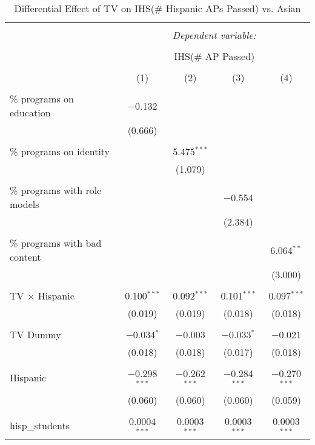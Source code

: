 
\begin{table}[!htbp] \centering 
  \caption{Differential Effect of TV on IHS(\# Hispanic APs Passed) vs. Asian} 
  \label{} 
\begin{tabular}{@{\extracolsep{-2pt}}lcccc} 
\\[-1.8ex]\hline 
\hline \\[-1.8ex] 
 & \multicolumn{4}{c}{\textit{Dependent variable:}} \\ 
\cline{2-5} 
\\[-1.8ex] & \multicolumn{4}{c}{IHS(\# AP Passed)} \\ 
\\[-1.8ex] & (1) & (2) & (3) & (4)\\ 
\hline \\[-1.8ex] 
 \% programs on education & $-$0.132 &  &  &  \\ 
  & (0.666) &  &  &  \\ 
  & & & & \\ 
 \% programs on identity &  & 5.475$^{***}$ &  &  \\ 
  &  & (1.079) &  &  \\ 
  & & & & \\ 
 \% programs with role models &  &  & $-$0.554 &  \\ 
  &  &  & (2.384) &  \\ 
  & & & & \\ 
 \% programs with bad content &  &  &  & 6.064$^{**}$ \\ 
  &  &  &  & (3.000) \\ 
  & & & & \\ 
 TV $\times$ Hispanic & 0.100$^{***}$ & 0.092$^{***}$ & 0.101$^{***}$ & 0.097$^{***}$ \\ 
  & (0.019) & (0.019) & (0.018) & (0.018) \\ 
  & & & & \\ 
 TV Dummy & $-$0.034$^{*}$ & $-$0.003 & $-$0.033$^{*}$ & $-$0.021 \\ 
  & (0.018) & (0.018) & (0.017) & (0.018) \\ 
  & & & & \\ 
 Hispanic & $-$0.298$^{***}$ & $-$0.262$^{***}$ & $-$0.284$^{***}$ & $-$0.270$^{***}$ \\ 
  & (0.060) & (0.060) & (0.060) & (0.059) \\ 
  & & & & \\ 
 hisp\_students & 0.0004$^{***}$ & 0.0003$^{***}$ & 0.0003$^{***}$ & 0.0003$^{***}$ \\ 

\end{tabular}
\end{table}
